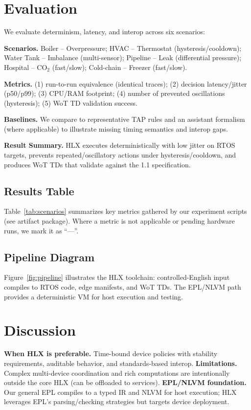 \documentclass[journal]{IEEEtran}
\begin{document}
\section{Evaluation}
We evaluate determinism, latency, and interop across six scenarios:

\noindent\textbf{Scenarios.} Boiler -- Overpressure; HVAC -- Thermostat (hysteresis/cooldown); Water Tank -- Imbalance (multi-sensor); Pipeline -- Leak (differential pressure); Hospital -- CO$_2$ (fast/slow); Cold-chain -- Freezer (fast/slow).

\noindent\textbf{Metrics.} (1) run-to-run equivalence (identical traces); (2) decision latency/jitter (p50/p99); (3) CPU/RAM footprint; (4) number of prevented oscillations (hysteresis); (5) WoT TD validation success.

\noindent\textbf{Baselines.} We compare to representative TAP rules and an assistant formalism (where applicable) to illustrate missing timing semantics and interop gaps.

\noindent\textbf{Result Summary.} HLX executes deterministically with low jitter on RTOS targets, prevents repeated/oscillatory actions under hysteresis/cooldown, and produces WoT TDs that validate against the 1.1 specification.

\subsection{Results Table}
Table~\ref{tab:scenarios} summarizes key metrics gathered by our experiment scripts (see artifact package). Where a metric is not applicable or pending hardware runs, we mark it as ``—''.



\subsection{Pipeline Diagram}
Figure~\ref{fig:pipeline} illustrates the HLX toolchain: controlled-English input compiles to RTOS code, edge manifests, and WoT TDs. The EPL/NLVM path provides a deterministic VM for host execution and testing.



\section{Discussion}
\textbf{When HLX is preferable.} Time-bound device policies with stability requirements, auditable behavior, and standards-based interop. \textbf{Limitations.} Complex multi-device coordination and rich computations are intentionally outside the core HLX (can be offloaded to services). \textbf{EPL/NLVM foundation.} Our general EPL compiles to a typed IR and NLVM for host execution; HLX leverages EPL’s parsing/checking strategies but targets device deployment.
\end{document}
